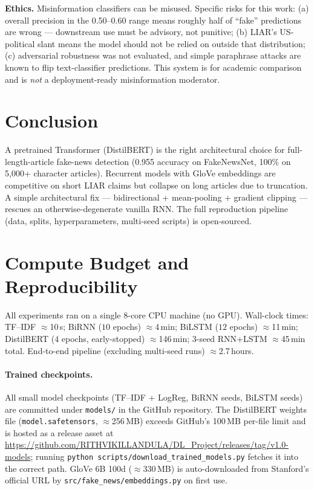 \documentclass{article}
\begin{document}
\textbf{Ethics.} Misinformation classifiers can be misused. Specific risks for this work: (a) overall precision in the 0.50--0.60 range means roughly half of ``fake'' predictions are wrong --- downstream use must be advisory, not punitive; (b) LIAR's US-political slant means the model should not be relied on outside that distribution; (c) adversarial robustness was not evaluated, and simple paraphrase attacks are known to flip text-classifier predictions. This system is for academic comparison and is \emph{not} a deployment-ready misinformation moderator.

\section{Conclusion}

A pretrained Transformer (DistilBERT) is the right architectural choice for full-length-article fake-news detection (0.955 accuracy on FakeNewsNet, 100\% on 5{,}000+ character articles). Recurrent models with GloVe embeddings are competitive on short LIAR claims but collapse on long articles due to truncation. A simple architectural fix --- bidirectional + mean-pooling + gradient clipping --- rescues an otherwise-degenerate vanilla RNN. The full reproduction pipeline (data, splits, hyperparameters, multi-seed scripts) is open-sourced.




\appendix

\section{Compute Budget and Reproducibility}\label{app:compute}

All experiments ran on a single 8-core CPU machine (no GPU). Wall-clock times: TF--IDF $\approx$10\,s; BiRNN ($10$ epochs) $\approx$4\,min; BiLSTM ($12$ epochs) $\approx$11\,min; DistilBERT ($4$ epochs, early-stopped) $\approx$146\,min; 3-seed RNN+LSTM $\approx$45\,min total. End-to-end pipeline (excluding multi-seed runs) $\approx$2.7\,hours.

\paragraph{Trained checkpoints.} All small model checkpoints (TF--IDF + LogReg, BiRNN seeds, BiLSTM seeds) are committed under \texttt{models/} in the GitHub repository. The DistilBERT weights file (\texttt{model.safetensors}, $\approx$256\,MB) exceeds GitHub's 100\,MB per-file limit and is hosted as a release asset at \url{https://github.com/RITHVIKILLANDULA/DL_Project/releases/tag/v1.0-models}; running \texttt{python scripts/download\_trained\_models.py} fetches it into the correct path. GloVe 6B 100d ($\approx$330\,MB) is auto-downloaded from Stanford's official URL by \texttt{src/fake\_news/embeddings.py} on first use.
\end{document}
